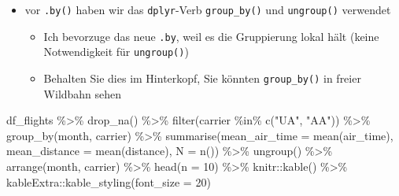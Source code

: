 \documentclass[
  letterpaper,
  DIV=11]{scrartcl}
\newenvironment{Shaded}{\begin{snugshade}}{\end{snugshade}}
\newcommand{\AttributeTok}[1]{\textcolor[rgb]{0.40,0.45,0.13}{#1}}
\newcommand{\DecValTok}[1]{\textcolor[rgb]{0.68,0.00,0.00}{#1}}
\newcommand{\FunctionTok}[1]{\textcolor[rgb]{0.28,0.35,0.67}{#1}}
\newcommand{\NormalTok}[1]{\textcolor[rgb]{0.00,0.23,0.31}{#1}}
\newcommand{\SpecialCharTok}[1]{\textcolor[rgb]{0.37,0.37,0.37}{#1}}
\newcommand{\StringTok}[1]{\textcolor[rgb]{0.13,0.47,0.30}{#1}}
\providecommand{\tightlist}{%
  \setlength{\itemsep}{0pt}\setlength{\parskip}{0pt}}\usepackage{longtable,booktabs,array}
\begin{document}
\begin{tcolorbox}[enhanced jigsaw, breakable, colbacktitle=quarto-callout-note-color!10!white, toptitle=1mm, bottomrule=.15mm, rightrule=.15mm, coltitle=black, toprule=.15mm, opacityback=0, leftrule=.75mm, left=2mm, colframe=quarto-callout-note-color-frame, bottomtitle=1mm, titlerule=0mm, title=\textcolor{quarto-callout-note-color}{\faInfo}\hspace{0.5em}{\texttt{group\_by()}}, arc=.35mm, colback=white, opacitybacktitle=0.6]

\begin{itemize}
\tightlist
\item
  vor \texttt{.by()} haben wir das \texttt{dplyr}-Verb
  \texttt{group\_by()} und \texttt{ungroup()} verwendet

  \begin{itemize}
  \tightlist
  \item
    Ich bevorzuge das neue \texttt{.by}, weil es die Gruppierung lokal
    hält (keine Notwendigkeit für \texttt{ungroup()})
  \item
    Behalten Sie dies im Hinterkopf, Sie könnten \texttt{group\_by()} in
    freier Wildbahn sehen
  \end{itemize}
\end{itemize}

\begin{Shaded}
\begin{Highlighting}[numbers=left,,]
\NormalTok{df\_flights }\SpecialCharTok{\%\textgreater{}\%} 
  \FunctionTok{drop\_na}\NormalTok{() }\SpecialCharTok{\%\textgreater{}\%}
  \FunctionTok{filter}\NormalTok{(carrier }\SpecialCharTok{\%in\%} \FunctionTok{c}\NormalTok{(}\StringTok{"UA"}\NormalTok{, }\StringTok{"AA"}\NormalTok{)) }\SpecialCharTok{\%\textgreater{}\%} 
  \FunctionTok{group\_by}\NormalTok{(month, carrier) }\SpecialCharTok{\%\textgreater{}\%} 
  \FunctionTok{summarise}\NormalTok{(}\AttributeTok{mean\_air\_time =} \FunctionTok{mean}\NormalTok{(air\_time),}
            \AttributeTok{mean\_distance =} \FunctionTok{mean}\NormalTok{(distance),}
            \AttributeTok{N =} \FunctionTok{n}\NormalTok{()) }\SpecialCharTok{\%\textgreater{}\%} 
  \FunctionTok{ungroup}\NormalTok{() }\SpecialCharTok{\%\textgreater{}\%} 
  \FunctionTok{arrange}\NormalTok{(month, carrier) }\SpecialCharTok{\%\textgreater{}\%} 
  \FunctionTok{head}\NormalTok{(}\AttributeTok{n =} \DecValTok{10}\NormalTok{) }\SpecialCharTok{\%\textgreater{}\%} 
\NormalTok{  knitr}\SpecialCharTok{::}\FunctionTok{kable}\NormalTok{() }\SpecialCharTok{\%\textgreater{}\%} 
\NormalTok{  kableExtra}\SpecialCharTok{::}\FunctionTok{kable\_styling}\NormalTok{(}\AttributeTok{font\_size =} \DecValTok{20}\NormalTok{) }
\end{Highlighting}
\end{Shaded}


\end{tcolorbox}
\end{document}
